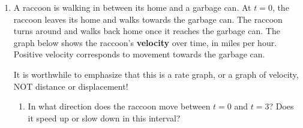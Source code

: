 \documentclass{article}
\begin{document}
\begin{enumerate}
\begin{enumerate}
      \begin{solution}
        $\displaystyle \sum_{k=2}^5 k^4$ is one possible answer.  Remember
        that the variable you use in $\sum$ notation doesn't mean anything,
        so you could also write $\displaystyle \sum_{n=2}^5 n^4$.
      \end{solution}

    \item
      \begin{problem}
        $ \ln 1 + \ln 3 + \ln 5 + \ln 7 + \ln 9 + \ln 11 = $
      \end{problem}\vfill

      \begin{solution}
        $\displaystyle \sum_{k=0}^5 \ln(2k+1)$ is one possible answer.
      \end{solution}



    \end{enumerate}
    \newpage
    \item A raccoon is walking in between its home and a garbage can. At $t=0$, the raccoon leaves its home and walks towards the garbage can. The raccoon turns around and walks back home once it reaches the garbage can. The graph below shows the raccoon's \textbf{velocity} over time, in miles per hour. Positive velocity corresponds to movement towards the garbage can.
\begin{workshop}
    It is worthwhile to emphasize that this is a rate graph, or a graph of velocity, NOT distance or displacement!
\end{workshop}

     \begin{center}
      \end{center}

  
    \begin{enumerate}
        \item In what direction does the raccoon move between $t=0$ and $t=3$? Does it speed up or slow down in this interval? 
        

\end{enumerate}
\end{enumerate}
\end{document}
